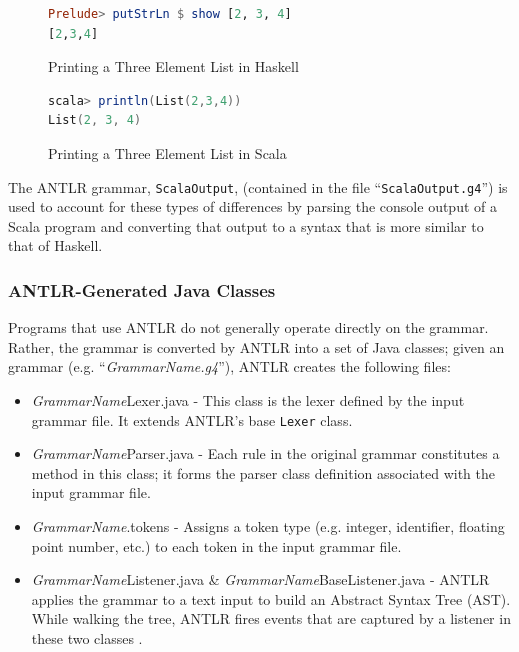 \documentclass{report}
\begin{document}
\begin{figure}[H]
\begin{mdframed}
\begin{lstlisting}[language=Haskell]
Prelude> putStrLn $ show [2, 3, 4]
[2,3,4]
\end{lstlisting}
\end{mdframed}
\caption{Printing a Three Element List in Haskell}\label{fig:printListHaskell}
\end{figure}

\begin{figure}[H]
\begin{mdframed}
\begin{lstlisting}[language=Scala]
scala> println(List(2,3,4))
List(2, 3, 4)
\end{lstlisting}
\end{mdframed}
\caption{Printing a Three Element List in Scala}\label{fig:printListScala}
\end{figure}

The ANTLR grammar, \texttt{ScalaOutput}, (contained in the file ``\texttt{ScalaOutput.g4}'') is used to account for these types of differences by parsing the console output of a Scala program and converting that output to a syntax that is more similar to that of Haskell.

\subsubsection{ANTLR-Generated Java Classes}

Programs that use ANTLR do not generally operate directly on the grammar.  Rather, the grammar is converted by ANTLR into a set of Java classes; given an  grammar (e.g. ``\emph{GrammarName.g4}''),  ANTLR creates the following files:

\begin{itemize}
	\item \emph{GrammarName}Lexer.java - This class is the lexer defined by the input grammar file.  It extends ANTLR's base \texttt{Lexer} class.
	
	\item \emph{GrammarName}Parser.java - Each rule in the original grammar constitutes a method in this class; it forms the parser class definition associated with the input grammar file.
	
	\item \emph{GrammarName}.tokens - Assigns a token type (e.g. integer, identifier, floating point number, etc.) to each token in the input grammar file.
	
	\item \emph{GrammarName}Listener.java \& \emph{GrammarName}BaseListener.java - ANTLR applies the grammar to a text input to build an Abstract Syntax Tree (AST).  While walking the tree, ANTLR fires events that are captured by a listener in these two classes \cite{antlrDefinitiveReference}.
	
\end{itemize}
\end{document}
